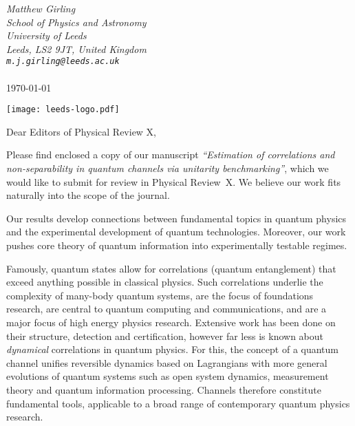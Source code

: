 \documentclass[11pt]{letter}
\newcommand{\ddd}[1]{\textcolor{Blue}{[#1]}}
\begin{document}
\hfill\begin{minipage}{6cm}
	\raggedright
	\vspace{-2.5cm}
	{\footnotesize\itshape Matthew Girling}\\
	{\footnotesize\itshape School of Physics and Astronomy}\\
	{\footnotesize\itshape University of Leeds}\\
	{\footnotesize\itshape Leeds, LS2 9JT, United Kingdom}\\
	{\footnotesize\itshape %
		\verb|m.j.girling@leeds.ac.uk|}\\
	~\\
		\footnotesize\today
\end{minipage}

\vspace{-3.5cm}
\texttt{[image: leeds-logo.pdf]}
\vspace{3.5cm}


\vspace{-1.5cm}
Dear Editors of Physical Review X,

\vspace{.3cm}
	
Please find enclosed a copy of our manuscript \emph{``Estimation of correlations and non-separability in quantum channels via unitarity benchmarking''}, which we would like to submit for review in Physical Review~X. We believe our work fits naturally into the scope of the journal. 



Our results develop connections between fundamental topics in quantum physics and the experimental development of quantum technologies. Moreover, our work pushes core theory of quantum information into experimentally testable regimes.

Famously, quantum states allow for correlations (quantum entanglement) that exceed anything possible in classical physics. Such correlations underlie the complexity of many-body quantum systems, are the focus of foundations research, are central to quantum computing and communications, and are a major focus of high energy physics research. Extensive work has been done on their structure, detection and certification, however far less is known about \emph{dynamical} correlations in quantum physics. For this, the concept of a quantum channel unifies reversible dynamics based on Lagrangians with more general evolutions of quantum systems such as open system dynamics, measurement theory and quantum information processing. Channels therefore constitute fundamental tools, applicable to a broad range of contemporary quantum physics research.
\end{document}
